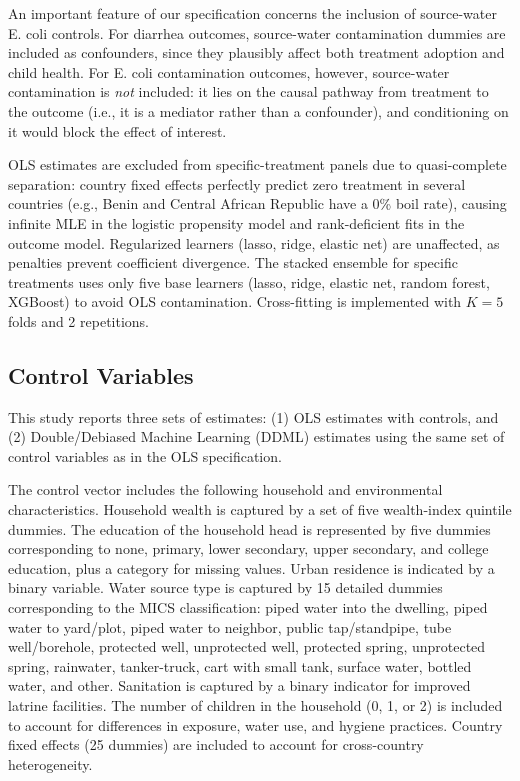 \documentclass [11pt]{article}
\theoremstyle{plain}
\theoremstyle{definition}
\theoremstyle{remark}
\newcommand{\1}{\bm{1}}
\begin{document}
An important feature of our specification concerns the inclusion of source-water E. coli controls. For diarrhea outcomes, source-water contamination dummies are included as confounders, since they plausibly affect both treatment adoption and child health. For E. coli contamination outcomes, however, source-water contamination is \textit{not} included: it lies on the causal pathway from treatment to the outcome (i.e., it is a mediator rather than a confounder), and conditioning on it would block the effect of interest.

OLS estimates are excluded from specific-treatment panels due to quasi-complete separation: country fixed effects perfectly predict zero treatment in several countries (e.g., Benin and Central African Republic have a 0\% boil rate), causing infinite MLE in the logistic propensity model and rank-deficient fits in the outcome model. Regularized learners (lasso, ridge, elastic net) are unaffected, as penalties prevent coefficient divergence. The stacked ensemble for specific treatments uses only five base learners (lasso, ridge, elastic net, random forest, XGBoost) to avoid OLS contamination. Cross-fitting is implemented with $K = 5$ folds and 2 repetitions.



\subsection{Control Variables}

This study reports three sets of estimates: (1) OLS estimates with controls, and (2) Double/Debiased Machine Learning (DDML) estimates using the same set of control variables as in the OLS specification.

The control vector includes the following household and environmental characteristics. Household wealth is captured by a set of five wealth-index quintile dummies. The education of the household head is represented by five dummies corresponding to none, primary, lower secondary, upper secondary, and college education, plus a category for missing values. Urban residence is indicated by a binary variable. Water source type is captured by 15 detailed dummies corresponding to the MICS classification: piped water into the dwelling, piped water to yard/plot, piped water to neighbor, public tap/standpipe, tube well/borehole, protected well, unprotected well, protected spring, unprotected spring, rainwater, tanker-truck, cart with small tank, surface water, bottled water, and other. Sanitation is captured by a binary indicator for improved latrine facilities. The number of children in the household (0, 1, or 2) is included to account for differences in exposure, water use, and hygiene practices. Country fixed effects (25 dummies) are included to account for cross-country heterogeneity.
\end{document}
